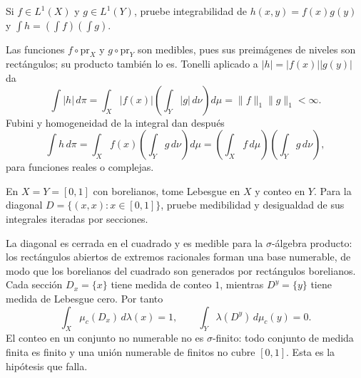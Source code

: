 \begin{ejercicio}\label{ej:v2-l11-4}
Si $f\in L^1(X)$ y $g\in L^1(Y)$, pruebe integrabilidad de $h(x,y)=f(x)g(y)$ y $\int h=(\int f)(\int g)$.
\end{ejercicio}
\begin{solucion}
Las funciones $f\circ\mathrm{pr}_X$ y $g\circ\mathrm{pr}_Y$ son medibles, pues sus preimágenes de niveles son rectángulos; su producto también lo es. Tonelli aplicado a $|h|=|f(x)||g(y)|$ da
\[\int|h|\,d\pi=\int_X|f(x)|\left(\int_Y|g|\,d\nu\right)d\mu
=\|f\|_1\|g\|_1<\infty.\]
Fubini y homogeneidad de la integral dan después
\[\int h\,d\pi=\int_X f(x)\left(\int_Y g\,d\nu\right)d\mu
=\left(\int_X f\,d\mu\right)\left(\int_Y g\,d\nu\right),\]
para funciones reales o complejas.
\end{solucion}

\begin{ejercicio}\label{ej:v2-l11-5}
En $X=Y=[0,1]$ con borelianos, tome Lebesgue en $X$ y conteo en $Y$. Para la diagonal $D=\{(x,x):x\in[0,1]\}$, pruebe medibilidad y desigualdad de sus integrales iteradas por secciones.
\end{ejercicio}
\begin{solucion}
La diagonal es cerrada en el cuadrado y es medible para la $\sigma$-álgebra producto: los rectángulos abiertos de extremos racionales forman una base numerable, de modo que los borelianos del cuadrado son generados por rectángulos borelianos. Cada sección $D_x=\{x\}$ tiene medida de conteo $1$, mientras $D^y=\{y\}$ tiene medida de Lebesgue cero. Por tanto
\[\int_X\mu_c(D_x)\,d\lambda(x)=1,\qquad\int_Y\lambda(D^y)\,d\mu_c(y)=0.\]
El conteo en un conjunto no numerable no es $\sigma$-finito: todo conjunto de medida finita es finito y una unión numerable de finitos no cubre $[0,1]$. Esta es la hipótesis que falla.
\end{solucion}

